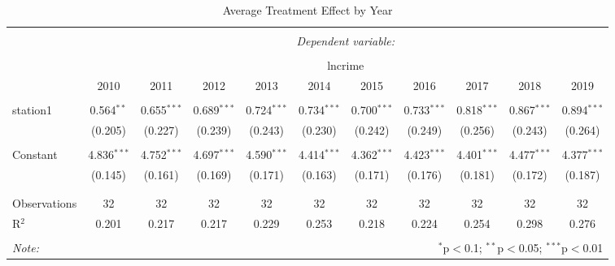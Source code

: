 \documentclass[a4paper, 11pt]{article}
\begin{document}
\begin{landscape}
\begin{table}[!htbp] \centering 
  \caption{Average Treatment Effect by Year} 
  \label{tab:ate-year} 
\begin{tabular}{@{\extracolsep{5pt}}lcccccccccc} 
\\[-1.8ex]\hline 
\hline \\[-1.8ex] 
 & \multicolumn{10}{c}{\textit{Dependent variable:}} \\ 
\cline{2-11} 
\\[-1.8ex] & \multicolumn{10}{c}{lncrime} \\ 
 & 2010 & 2011 & 2012 & 2013 & 2014 & 2015 & 2016 & 2017 & 2018 & 2019 \\ 
\hline \\[-1.8ex] 
 station1 & 0.564$^{**}$ & 0.655$^{***}$ & 0.689$^{***}$ & 0.724$^{***}$ & 0.734$^{***}$ & 0.700$^{***}$ & 0.733$^{***}$ & 0.818$^{***}$ & 0.867$^{***}$ & 0.894$^{***}$ \\ 
  & (0.205) & (0.227) & (0.239) & (0.243) & (0.230) & (0.242) & (0.249) & (0.256) & (0.243) & (0.264) \\ 
  & & & & & & & & & & \\ 
 Constant & 4.836$^{***}$ & 4.752$^{***}$ & 4.697$^{***}$ & 4.590$^{***}$ & 4.414$^{***}$ & 4.362$^{***}$ & 4.423$^{***}$ & 4.401$^{***}$ & 4.477$^{***}$ & 4.377$^{***}$ \\ 
  & (0.145) & (0.161) & (0.169) & (0.171) & (0.163) & (0.171) & (0.176) & (0.181) & (0.172) & (0.187) \\ 
  & & & & & & & & & & \\ 
\hline \\[-1.8ex] 
Observations & 32 & 32 & 32 & 32 & 32 & 32 & 32 & 32 & 32 & 32 \\ 
R$^{2}$ & 0.201 & 0.217 & 0.217 & 0.229 & 0.253 & 0.218 & 0.224 & 0.254 & 0.298 & 0.276 \\ 
\hline 
\hline \\[-1.8ex] 
\textit{Note:}  & \multicolumn{10}{r}{$^{*}$p$<$0.1; $^{**}$p$<$0.05; $^{***}$p$<$0.01} \\ 
\end{tabular} 

\vspace{4em}


\end{table}
\end{landscape}
\end{document}

